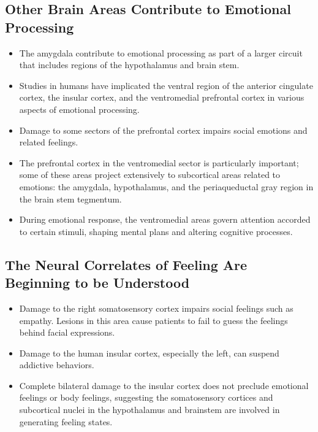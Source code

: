 \documentclass[12pt,a4paper]{article}
\begin{document}
\subsection{Other Brain Areas Contribute to Emotional Processing}
\begin{itemize}
    \item The amygdala contribute to emotional processing as part of a larger circuit that includes regions of the hypothalamus and brain stem.
    \item Studies in humans have implicated the ventral region of the anterior cingulate cortex, the insular cortex, and the ventromedial prefrontal cortex in various aspects of emotional processing.
    \item Damage to some sectors of the prefrontal cortex impairs social emotions and related feelings.
    \item The prefrontal cortex in the ventromedial sector is particularly important; some of these areas project extensively to subcortical areas related to emotions: the amygdala, hypothalamus, and the periaqueductal gray region in the brain stem tegmentum.
    \item During emotional response, the ventromedial areas govern attention accorded to certain stimuli, shaping mental plans and altering cognitive processes.
\end{itemize}

\subsection{The Neural Correlates of Feeling Are Beginning to be Understood}
\begin{itemize}
    \item Damage to the right somatosensory cortex impairs social feelings such as empathy. Lesions in this area cause patients to fail to guess the feelings behind facial expressions.
    \item Damage to the human insular cortex, especially the left, can suspend addictive behaviors.
    \item Complete bilateral damage to the insular cortex does not preclude emotional feelings or body feelings, suggesting the somatosensory cortices and subcortical nuclei in the hypothalamus and brainstem are involved in generating feeling states.
\end{itemize}

\clearpage
\end{document}
